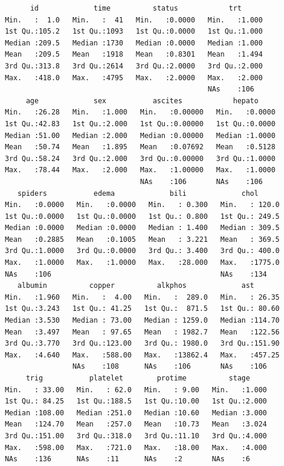 \documentclass[
  a4paper,
]{memoir}
\begin{document}
\begin{tcolorbox}
\begin{verbatim}
       id             time          status            trt       
 Min.   :  1.0   Min.   :  41   Min.   :0.0000   Min.   :1.000  
 1st Qu.:105.2   1st Qu.:1093   1st Qu.:0.0000   1st Qu.:1.000  
 Median :209.5   Median :1730   Median :0.0000   Median :1.000  
 Mean   :209.5   Mean   :1918   Mean   :0.8301   Mean   :1.494  
 3rd Qu.:313.8   3rd Qu.:2614   3rd Qu.:2.0000   3rd Qu.:2.000  
 Max.   :418.0   Max.   :4795   Max.   :2.0000   Max.   :2.000  
                                                 NAs    :106    
      age             sex           ascites            hepato      
 Min.   :26.28   Min.   :1.000   Min.   :0.00000   Min.   :0.0000  
 1st Qu.:42.83   1st Qu.:2.000   1st Qu.:0.00000   1st Qu.:0.0000  
 Median :51.00   Median :2.000   Median :0.00000   Median :1.0000  
 Mean   :50.74   Mean   :1.895   Mean   :0.07692   Mean   :0.5128  
 3rd Qu.:58.24   3rd Qu.:2.000   3rd Qu.:0.00000   3rd Qu.:1.0000  
 Max.   :78.44   Max.   :2.000   Max.   :1.00000   Max.   :1.0000  
                                 NAs    :106       NAs    :106     
    spiders           edema             bili             chol       
 Min.   :0.0000   Min.   :0.0000   Min.   : 0.300   Min.   : 120.0  
 1st Qu.:0.0000   1st Qu.:0.0000   1st Qu.: 0.800   1st Qu.: 249.5  
 Median :0.0000   Median :0.0000   Median : 1.400   Median : 309.5  
 Mean   :0.2885   Mean   :0.1005   Mean   : 3.221   Mean   : 369.5  
 3rd Qu.:1.0000   3rd Qu.:0.0000   3rd Qu.: 3.400   3rd Qu.: 400.0  
 Max.   :1.0000   Max.   :1.0000   Max.   :28.000   Max.   :1775.0  
 NAs    :106                                        NAs    :134     
    albumin          copper          alkphos             ast        
 Min.   :1.960   Min.   :  4.00   Min.   :  289.0   Min.   : 26.35  
 1st Qu.:3.243   1st Qu.: 41.25   1st Qu.:  871.5   1st Qu.: 80.60  
 Median :3.530   Median : 73.00   Median : 1259.0   Median :114.70  
 Mean   :3.497   Mean   : 97.65   Mean   : 1982.7   Mean   :122.56  
 3rd Qu.:3.770   3rd Qu.:123.00   3rd Qu.: 1980.0   3rd Qu.:151.90  
 Max.   :4.640   Max.   :588.00   Max.   :13862.4   Max.   :457.25  
                 NAs    :108      NAs    :106       NAs    :106     
      trig           platelet        protime          stage      
 Min.   : 33.00   Min.   : 62.0   Min.   : 9.00   Min.   :1.000  
 1st Qu.: 84.25   1st Qu.:188.5   1st Qu.:10.00   1st Qu.:2.000  
 Median :108.00   Median :251.0   Median :10.60   Median :3.000  
 Mean   :124.70   Mean   :257.0   Mean   :10.73   Mean   :3.024  
 3rd Qu.:151.00   3rd Qu.:318.0   3rd Qu.:11.10   3rd Qu.:4.000  
 Max.   :598.00   Max.   :721.0   Max.   :18.00   Max.   :4.000  
 NAs    :136      NAs    :11      NAs    :2       NAs    :6      
\end{verbatim}


\end{tcolorbox}
\end{document}
